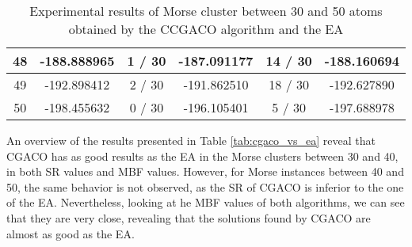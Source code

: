 \begin{table}[!htdp]
\begin{center}
\begin{tabular}{| c | c | c | c | c | c |}
						48 & -188.888965 & 1 / 30 & -187.091177 & 14 / 30 & -188.160694 \\ \hline
						49 & -192.898412 & 2 / 30 & -191.862510 & 18 / 30 & -192.627890 \\ \hline
						50 & -198.455632 & 0 / 30 & -196.105401 & 5 / 30 & -197.688978 \\ \hline
					\end{tabular}
				\end{center}
				\caption{Experimental results of Morse cluster between 30 and 50 atoms obtained by the CCGACO algorithm and the EA}
			\end{table}
			
			An overview of the results presented in Table \ref{tab:cgaco_vs_ea} reveal that CGACO has as good results as the EA in the Morse clusters between 30 and 40, in both SR values and MBF values. However, for Morse instances between 40 and 50, the same behavior is not observed, as the SR of CGACO is inferior to the one of the EA. Nevertheless, looking at he MBF values of both algorithms, we can see that they are very close, revealing that the solutions found by CGACO are almost as good as the EA.
	
	
	
	

	